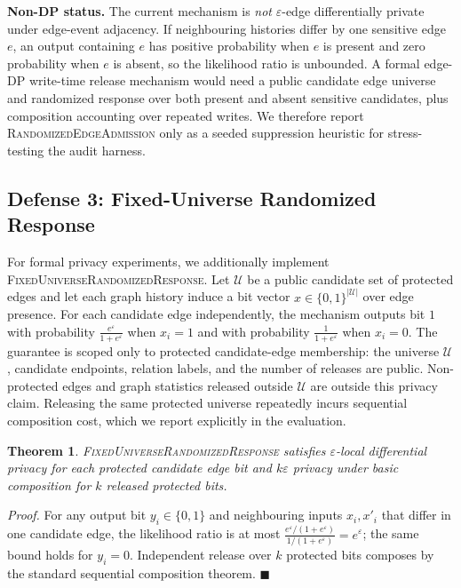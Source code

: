 \documentclass[journal,10pt,twocolumn]{IEEEtran}
\newtheorem{theorem}{Theorem}
\begin{document}
\textbf{Non-DP status.} The current mechanism is \emph{not}
$\varepsilon$-edge differentially private under edge-event adjacency.
If neighbouring histories differ by one sensitive edge $e$, an output
containing $e$ has positive probability when $e$ is present and zero
probability when $e$ is absent, so the likelihood ratio is unbounded.
A formal edge-DP write-time release mechanism would need a public
candidate edge universe and randomized response over both present and
absent sensitive candidates, plus composition accounting over repeated
writes. We therefore report \textsc{RandomizedEdgeAdmission} only as a
seeded suppression heuristic for stress-testing the audit harness.

\subsection{Defense 3: Fixed-Universe Randomized Response}
For formal privacy experiments, we additionally implement
\textsc{FixedUniverseRandomizedResponse}. Let $\mathcal{U}$ be a public
candidate set of protected edges and let each graph history induce a
bit vector $x \in \{0,1\}^{|\mathcal{U}|}$ over edge presence. For
each candidate edge independently, the mechanism outputs bit $1$ with
probability $\frac{e^\varepsilon}{1+e^\varepsilon}$ when $x_i=1$ and
with probability $\frac{1}{1+e^\varepsilon}$ when $x_i=0$.
The guarantee is scoped only to protected candidate-edge membership:
the universe $\mathcal{U}$, candidate endpoints, relation labels, and
the number of releases are public. Non-protected edges and graph
statistics released outside $\mathcal{U}$ are outside this privacy
claim. Releasing the same protected universe repeatedly incurs
sequential composition cost, which we report explicitly in the
evaluation.

\begin{theorem}
\label{thm:fixed-universe-dp}
\textsc{FixedUniverseRandomizedResponse} satisfies
$\varepsilon$-local differential privacy for each protected candidate
edge bit and $k\varepsilon$ privacy under basic composition for $k$
released protected bits.
\end{theorem}
\emph{Proof.} For any output bit $y_i \in \{0,1\}$ and neighbouring
inputs $x_i,x'_i$ that differ in one candidate edge, the likelihood
ratio is at most
$\frac{e^\varepsilon/(1+e^\varepsilon)}
{1/(1+e^\varepsilon)} = e^\varepsilon$; the same bound holds for
$y_i=0$. Independent release over $k$ protected bits composes by the
standard sequential composition theorem. \hfill $\blacksquare$
\end{document}
